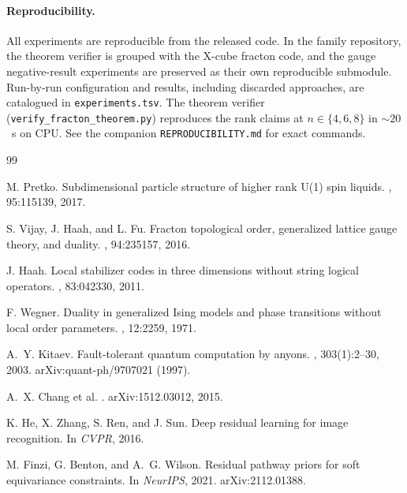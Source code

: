 \documentclass[11pt,a4paper]{article}
\begin{document}
\paragraph{Reproducibility.}
All experiments are reproducible from the released code. In the family
repository, the theorem verifier is grouped with the X-cube fracton code, and
the gauge negative-result experiments are preserved as their own reproducible
submodule. Run-by-run
configuration and results, including discarded approaches, are
catalogued in \texttt{experiments.tsv}. The theorem verifier
(\texttt{verify\_fracton\_theorem.py}) reproduces the rank claims at
$n \in \{4,6,8\}$ in $\sim 20$~s on CPU. See the companion
\texttt{REPRODUCIBILITY.md} for exact commands.

\begin{thebibliography}{99}

 M. Pretko.
\newblock Subdimensional particle structure of higher rank U(1) spin liquids.
, 95:115139, 2017.

 S. Vijay, J. Haah, and L. Fu.
\newblock Fracton topological order, generalized lattice gauge theory, and duality.
, 94:235157, 2016.

 J. Haah.
\newblock Local stabilizer codes in three dimensions without string logical operators.
, 83:042330, 2011.

 F. Wegner.
\newblock Duality in generalized {I}sing models and phase transitions without local order parameters.
, 12:2259, 1971.

 A.~Y. Kitaev.
\newblock Fault-tolerant quantum computation by anyons.
, 303(1):2--30, 2003.
  arXiv:quant-ph/9707021 (1997).

 A.~X. Chang et al.
.
\newblock arXiv:1512.03012, 2015.

 K. He, X. Zhang, S. Ren, and J. Sun.
\newblock Deep residual learning for image recognition.
\newblock In {\em CVPR}, 2016.

 M. Finzi, G. Benton, and A.~G. Wilson.
\newblock Residual pathway priors for soft equivariance constraints.
\newblock In {\em NeurIPS}, 2021. arXiv:2112.01388.

\end{thebibliography}
\end{document}
